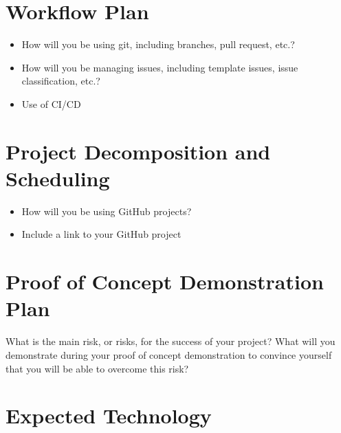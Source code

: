 \documentclass{article}
\begin{document}
\section{Workflow Plan}

\begin{itemize}
	\item How will you be using git, including branches, pull request, etc.?
	\item How will you be managing issues, including template issues, issue
	classification, etc.?
  \item Use of CI/CD
\end{itemize}

\section{Project Decomposition and Scheduling}

\begin{itemize}
  \item How will you be using GitHub projects?
  \item Include a link to your GitHub project
\end{itemize}


\section{Proof of Concept Demonstration Plan}

What is the main risk, or risks, for the success of your project?  What will you
demonstrate during your proof of concept demonstration to convince yourself that
you will be able to overcome this risk?

\section{Expected Technology}

\end{document}
